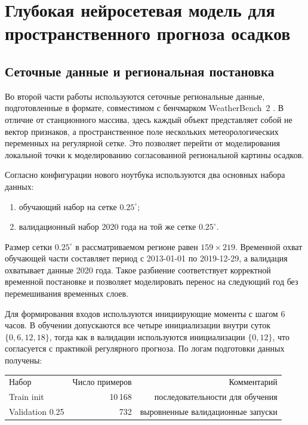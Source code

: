 \chapter{Глубокая нейросетевая модель для пространственного прогноза осадков}

\section{Сеточные данные и региональная постановка}

Во второй части работы используются сеточные региональные данные, подготовленные в формате, совместимом с бенчмарком WeatherBench~2 \cite{weatherbench2}. В отличие от станционного массива, здесь каждый объект представляет собой не вектор признаков, а пространственное поле нескольких метеорологических переменных на регулярной сетке. Это позволяет перейти от моделирования локальной точки к моделированию согласованной региональной картины осадков.

Согласно конфигурации нового ноутбука используются два основных набора данных:
\begin{enumerate}
    \item обучающий набор на сетке \(0.25^\circ\);
    \item валидационный набор 2020 года на той же сетке \(0.25^\circ\).
\end{enumerate}

Размер сетки \(0.25^\circ\) в рассматриваемом регионе равен \(159\times219\). Временной охват обучающей части составляет период с 2013-01-01 по 2019-12-29, а валидация охватывает данные 2020 года. Такое разбиение соответствует корректной временной постановке и позволяет моделировать перенос на следующий год без перемешивания временных слоев.

Для формирования входов используются инициирующие моменты с шагом 6 часов. В обучении допускаются все четыре инициализации внутри суток \(\{0,6,12,18\}\), тогда как в валидации используются инициализации \(\{0,12\}\), что согласуется с практикой регулярного прогноза. По логам подготовки данных получены:
\begin{center}
\begin{tabular}{lrr}
Набор & Число примеров & Комментарий \\
Train init & 10\,168 & последовательности для обучения \\
Validation 0.25 & 732 & выровненные валидационные запуски \\
\end{tabular}
\end{center}

